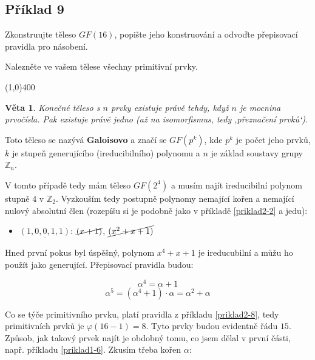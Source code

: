 \documentclass{article}
\newtheorem{veta}{Věta}[section]
\begin{document}
\subsection{Příklad 9}
Zkonstruujte těleso $GF(16)$, popište jeho konstruování a odvoďte přepisovací pravidla pro násobení.

Nalezněte ve vašem tělese všechny primitivní prvky.

\line(1,0){400}

\begin{veta}
Konečné těleso s $n$ prvky existuje právě tehdy, když $n$ je mocnina prvočísla. Pak existuje právě jedno (až na isomorfismus, tedy ‚přeznačení prvků‘).
\end{veta}

Toto těleso se nazývá \textbf{Galoisovo} a značí se $GF(p^k)$, kde $p^k$ je počet jeho prvků, $k$ je stupeň generujícího (ireducibilního) polynomu a $n$ je základ soustavy grupy $\mathbb{Z}_n$. 

V tomto případě tedy mám těleso $GF(2^4)$ a musím najít ireducibilní polynom stupně $4$ v $\mathbb{Z}_2$. Vyzkouším tedy postupně polynomy nemající kořen a nemající nulový absolutní člen (rozepíšu si je podobně jako v příkladě \ref{priklad2-2} a jedu):

\begin{itemize}
	\item $\underline{(1,0,0,1,1)}$: $\cancel{(x+1)}$, $\cancel{(x^2 + x + 1)}$ 
\end{itemize}

Hned první pokus byl úspěšný, polynom $x^4 + x + 1$ je ireducubilní a můžu ho použít jako generující. Přepisovací pravidla budou:

\[ \alpha^4 = \alpha + 1 \]	
\[ \alpha^5 = (\alpha^4 + 1)\cdot \alpha = \alpha^2 + \alpha\]

Co se týče primitivního prvku, platí pravidla z příkladu \ref{priklad2-8}, tedy primitivních prvků je $\varphi(16 - 1) = 8$. Tyto prvky budou evidentně řádu $15$. Způsob, jak takový prvek najít je obdobný tomu, co jsem dělal v první části, např. příkladu \ref{priklad1-6}. Zkusím třeba kořen $\alpha$:
\end{document}
